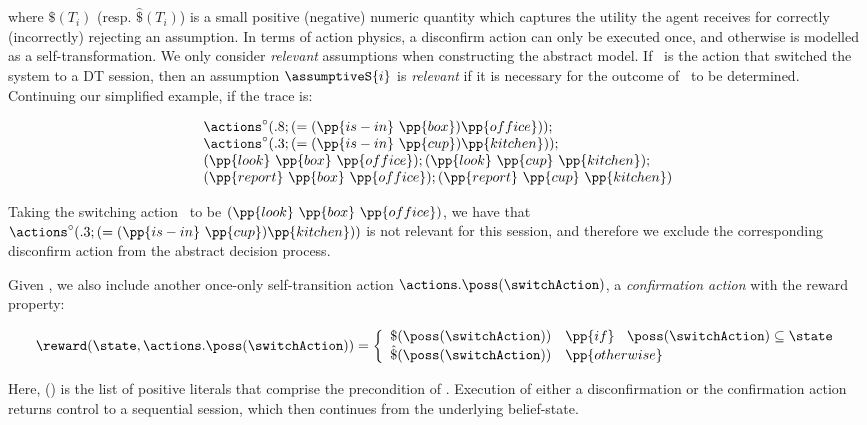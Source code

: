 \vspace{-1ex}

\noindent where $\$(T_i)$ (resp. $\hat\$(T_i)$) is a
small positive (negative) numeric quantity which captures
the utility the agent receives for correctly (incorrectly) rejecting
an assumption.
In terms of action physics, a disconfirm action can only be executed
once, and otherwise is modelled as a self-transformation.
We only consider {\em relevant} assumptions when constructing the
abstract model.  If \switchAction\ is the action that switched the
system to a DT session, then an assumption $\assumptiveS{i}$ is {\em
relevant} if it is necessary for the outcome of \switchAction\ to be
determined.  Continuing our simplified example, if the trace is:

\tiny
\[
\begin{array}{l}
\actions^{\circ}(.8;(=(\pp{is-in}~\pp{box})\pp{office}));\\
\actions^{\circ}(.3;(=(\pp{is-in}~\pp{cup})\pp{kitchen}));\\
(\pp{look}~\pp{box}~\pp{office});
(\pp{look}~\pp{cup}~\pp{kitchen});\\
(\pp{report}~\pp{box}~\pp{office}); 
(\pp{report}~\pp{cup}~\pp{kitchen})
\end{array}
\]
\normalsize

\noindent Taking the switching action \switchAction\ to be
$(\pp{look}~\pp{box}~\pp{office})$, we have that
$\actions^{\circ}(.3;(=(\pp{is-in}~\pp{cup})\pp{kitchen}))$ is not
relevant for this session, and therefore we exclude the corresponding
disconfirm action from the abstract decision process.

Given \switchAction, we also include another once-only self-transition
action $\actions.\poss(\switchAction)$, a \emph{confirmation action}
with the reward property:

\[
\reward(\state, \actions.\poss(\switchAction)) = \bigg\{ \begin{array}{ll}
\$(\poss(\switchAction)) & \pp{if}~\;\; \poss(\switchAction) \subseteq \state \\
\hat\$(\poss(\switchAction)) & \pp{otherwise} \\
\end{array}
\]

\noindent Here, \poss(\switchAction) is the list of positive literals
that comprise the precondition of \switchAction. Execution of
either a disconfirmation or the confirmation action returns control to
a sequential session, which then continues from the underlying
belief-state.

